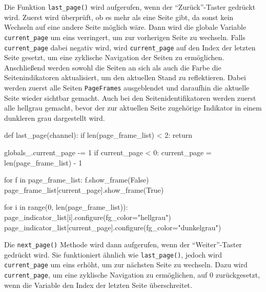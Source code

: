 Die Funktion \lstinline{last_page()} wird aufgerufen, wenn der \enquote{Zurück}-Taster gedrückt wird. Zuerst wird überprüft, ob es mehr als eine Seite gibt, da sonst kein Wechseln auf eine andere Seite möglich wäre. Dann wird die globale Variable \lstinline{current_page} um eins verringert, um zur vorherigen Seite zu wechseln. Falls \lstinline{current_page} dabei negativ wird, wird \lstinline{current_page} auf den Index der letzten Seite gesetzt, um eine zyklische Navigation der Seiten zu ermöglichen. Anschließend werden sowohl  die Seiten an sich als auch die Farbe die Seitenindikatoren aktualisiert, um den aktuellen Stand zu reflektieren. Dabei werden zuerst alle Seiten \bzw \lstinline{PageFrames} ausgeblendet und daraufhin die aktuelle Seite wieder sichtbar gemacht. Auch bei den Seitenidentifikatoren werden zuerst alle hellgrau gemacht, bevor der zur aktuellen Seite zugehörige Indikator in einem dunkleren grau dargestellt wird.

\begin{pythoncode}
def last_page(channel):
    if len(page_frame_list) < 2:
        return

    globals_.current_page -= 1
    if current_page < 0:
        current_page = len(page_frame_list) - 1

    for f in page_frame_list:
        f.show_frame(False)
    page_frame_list[current_page].show_frame(True)  

    for i in range(0, len(page_frame_list)):
        page_indicator_list[i].configure(fg_color="hellgrau")
    page_indicator_list[current_page].configure(fg_color="dunkelgrau")
\end{pythoncode}

Die \lstinline{next_page()} Methode wird dann aufgerufen, wenn der \enquote{Weiter}-Taster gedrückt wird. Sie funktioniert ähnlich wie \lstinline{last_page()}, jedoch wird \lstinline{current_page} um eins erhöht, um zur nächsten Seite zu wechseln. Dazu wird \lstinline{current_page}, um eine zyklische Navigation zu ermöglichen, auf 0 zurückgesetzt, wenn die Variable den Index der letzten Seite überschreitet.

